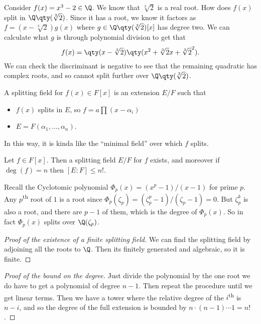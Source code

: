 \begin{example}
Consider $f(x) = x^3 - 2 \in \Q$. We know that $\sqrt[3]{2}$ is a real root. How does $f(x)$ split in $\Q\qty(\sqrt[3]{2})$. Since it has a root, we know it factors as $f = (x-\sqrt[3]{2})g(x)$ where $g \in \Q\qty(\sqrt[3]{2})[x]$ has degree two. We can calculate what $g$ is through polynomial division to get that
\[ f(x) = \qty(x-\sqrt[3]{2})\qty(x^2 + \sqrt[3]{2}x + \sqrt[3]{2}^2). \]
We can check the discriminant is negative to see that the remaining quadratic has complex roots, and so cannot split further over $\Q\qty(\sqrt[3]{2})$.
\end{example} 

\begin{definition}
A splitting field for $f(x) \in F[x]$ is an extension $E/F$ such that 
\begin{itemize}
\item $f(x)$ splits in $E$, so $f = a\prod (x-\alpha_i)$
\item $E = F(\alpha_1, \dotsc, \alpha_n)$.
\end{itemize}
In this way, it is kinda like the ``minimal field'' over which $f$ splits.
\end{definition}

\begin{theorem}
Let $f \in F[x]$. Then a splitting field $E/F$ for $f$ exists, and moreover if $\deg(f) = n$ then $[E:F] \leq n!$.
\end{theorem}

\begin{example}
Recall the Cyclotomic polynomial $\Phi_p(x) = (x^p-1)/(x-1)$ for prime $p$. Any $p$\textsuperscript{th} root of $1$ is a root since $\Phi_p(\zeta_p) = (\zeta_p^p-1)/(\zeta_p-1) = 0$. But $\zeta_p^k$ is also a root, and there are $p-1$ of them, which is the degree of $\Phi_p(x)$. So in fact $\Phi_p(x)$ splits over $\Q(\zeta_p)$.
\end{example}

\begin{proof}[Proof of the existence of a finite splitting field]
We can find the splitting field by adjoining all the roots to $\Q$. Then its finitely generated and algebraic, so it is finite.
\end{proof}

\begin{proof}[Proof of the bound on the degree]
Just divide the polynomial by the one root we do have to get a polynomial of degree $n-1$. Then repeat the procedure until we get linear terms. Then we have a tower where the relative degree of the $i$\textsuperscript{th} is $n-i$, and so the degree of the full extension is bounded by $n \cdot (n-1) \cdots 1 = n!$.
\end{proof}

